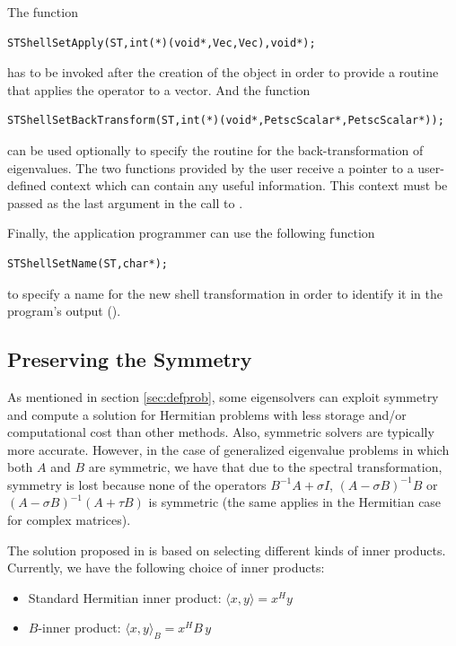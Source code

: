 	The function
	\begin{Verbatim}[fontsize=\small]
      STShellSetApply(ST,int(*)(void*,Vec,Vec),void*);
	\end{Verbatim}
has to be invoked after the creation of the  object in order to provide a routine that applies the operator to a vector. And the function
	\begin{Verbatim}[fontsize=\small]
      STShellSetBackTransform(ST,int(*)(void*,PetscScalar*,PetscScalar*));
	\end{Verbatim}
can be used optionally to specify the routine for the back-transformation of eigenvalues. The two functions provided by the user receive a pointer to a user-defined context which can contain any useful information. This context must be passed as the last argument in the call to .

	Finally, the application programmer can use the following function
	\begin{Verbatim}[fontsize=\small]
      STShellSetName(ST,char*);
	\end{Verbatim}
to specify a name for the new shell transformation in order to identify it in the program's output ().

\subsection{Preserving the Symmetry}
\label{sec:symm}

	As mentioned in section \ref{sec:defprob}, some eigensolvers can exploit symmetry and compute a solution for Hermitian problems with less storage and/or computational cost than other methods. Also, symmetric solvers are typically more accurate. However, in the case of generalized eigenvalue problems in which both $A$ and $B$ are symmetric, we have that due to the spectral transformation, symmetry is lost because none of the operators $B^{-1}\!A+\sigma I$, $(A-\sigma B)^{-1}B$ or $(A-\sigma B)^{-1}(A+\tau B)$ is symmetric (the same applies in the Hermitian case for complex matrices).

	The solution proposed in \slepc is based on selecting different kinds of inner products. Currently, we have the following choice of inner products:
  \begin{itemize}
    \item Standard Hermitian inner product: $\langle x,y\rangle=x^Hy$
    \item $B$-inner product: $\langle x,y\rangle_B=x^H\!B\,y$
  \end{itemize}

